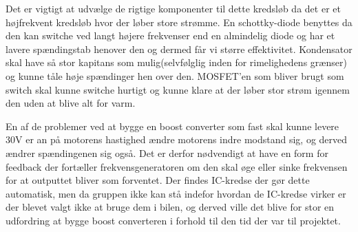 Det er vigtigt at udvælge de rigtige komponenter til dette kredsløb da det er et højfrekvent kredsløb hvor der løber store strømme. En schottky-diode benyttes da den kan switche ved langt højere frekvenser end en almindelig diode og har et lavere spændingstab henover den og dermed får vi større effektivitet. Kondensator skal have så stor kapitans som mulig(selvfølglig inden for rimelighedens grænser) og kunne tåle høje spændinger hen over den. MOSFET'en som bliver brugt som switch skal kunne switche hurtigt og kunne klare at der løber stor strøm igennem den uden at blive alt for varm.

En af de problemer ved at bygge en boost converter som fast skal kunne levere 30V er an på motorens hastighed ændre motorens indre modstand sig, og derved ændrer spændingenen sig også. Det er derfor nødvendigt at have en form for feedback der fortæller frekvensgeneratoren om den skal øge eller sinke frekvensen for at outputtet bliver som forventet. Der findes IC-kredse der gør dette automatisk, men da gruppen ikke kan stå indefor hvordan de IC-kredse virker er der blevet valgt ikke at bruge dem i  bilen, og derved ville det blive for stor en udfordring at bygge boost converteren i forhold til den tid der var til projektet.
